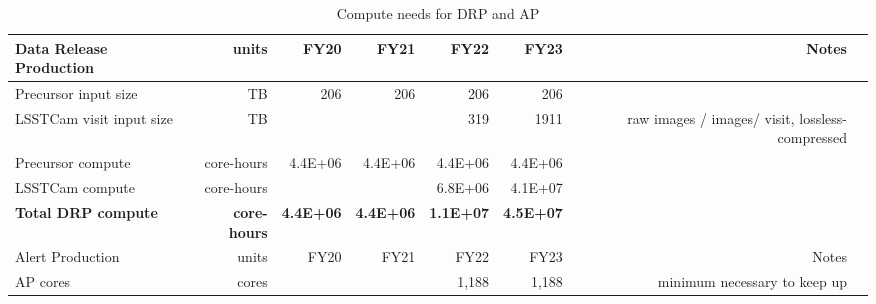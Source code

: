 \tiny \begin{longtable} { |p{}  |r  |r  |r  |r  |r  |r  |r |} 
\caption{Compute needs for DRP and AP \label{tab:drpAndAlertSizing}}\\ 
\hline 
\textbf{Data Release Production}&\textbf{units}&\textbf{FY20}&\textbf{FY21}&\textbf{FY22}&\textbf{FY23}&\textbf{Notes} \\ \hline
{Precursor input size}&{TB}&{206}&{206}&{206}&{206}& \\ \hline
{LSSTCam visit input size}&{TB}&{}&{}&{319}&{1911}&{raw images /  images/ visit, lossless-compressed} \\ \hline
{Precursor compute}&{core-hours}&{4.4E+06}&{4.4E+06}&{4.4E+06}&{4.4E+06}& \\ \hline
{LSSTCam compute}&{core-hours}&{}&{}&{6.8E+06}&{4.1E+07}& \\ \hline
\textbf{Total DRP compute}&\textbf{core-hours}&\textbf{4.4E+06}&\textbf{4.4E+06}&\textbf{1.1E+07}&\textbf{4.5E+07}& \\ \hline
{Alert Production}&{units}&{FY20}&{FY21}&{FY22}&{FY23}&{Notes} \\ \hline
{AP cores}&{cores}&{}&{}&{1,188}&{1,188}&{minimum necessary to keep up} \\ \hline
\end{longtable} \normalsize
